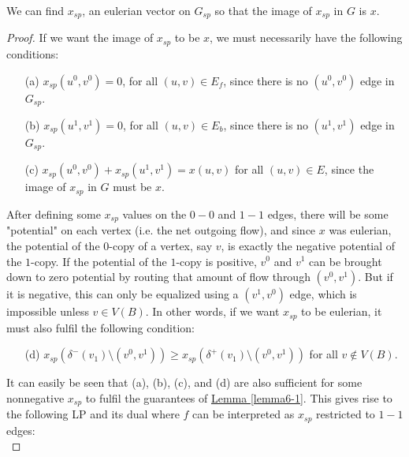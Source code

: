 \documentclass[./main.tex]{subfiles}
\begin{document}
			\begin{lemma}\label{lemma6-1}		
				We can find $x_{sp}$, an eulerian vector on $G_{sp}$ so that the image of $x_{sp}$ in $G$ is $x$.
			\end{lemma}
			\begin{proof}
			If we want the image of $x_{sp}$ to be $x$, we must necessarily have the following conditions:
				\begin{itemize}
					\item[(a)] $x_{sp}(u^0,v^0) = 0$, for all $(u,v)\in E_f$, since there is no $(u^0,v^0)$ edge in $G_{sp}$.
					\item[(b)] $x_{sp}(u^1,v^1) = 0$, for all $(u,v)\in E_b$, since there is no $(u^1,v^1)$ edge in $G_{sp}$.
					\item[(c)] $x_{sp}(u^0,v^0)+x_{sp}(u^1,v^1) = x(u,v)$ for all $(u,v)\in E$, since the image of $x_{sp}$ in $G$ must be $x$.\\
				\end{itemize}
	After defining some $x_{sp}$ values on the $0-0$ and $1-1$ edges, there will be some "potential" on each vertex (i.e. the net outgoing flow), and since $x$ was eulerian, the potential of the $0$-copy of a vertex, say $v$, is exactly the negative potential of the $1$-copy.
			If the potential of the $1$-copy is positive, $v^0$ and $v^1$ can be brought down to zero potential by routing that amount of flow through $(v^0,v^1)$. 
			But if it is negative, this can only be equalized using a $(v^1,v^0)$ edge, which is impossible unless $v\in V(B)$. In other words, if we want $x_{sp}$ to be eulerian, it must also fulfil the following condition:
			\begin{itemize}
				\item[(d)] $x_{sp}(\delta^-(v_1)\setminus (v^0,v^1) )\geqslant x_{sp}(\delta^+(v_1)\setminus (v^0,v^1))$ for all $v\notin V(B)$.
			\end{itemize}

			It can easily be seen that (a), (b), (c), and (d) are also sufficient for some nonnegative $x_{sp}$ to fulfil the guarantees of \hyperref[lemma6-1]{Lemma \ref{lemma6-1}}.
			 This gives rise to the following LP and its dual where $f$ can be interpreted as $x_{sp}$ restricted to $1-1$ edges:\\
			 \vspace{2mm}
			

\end{proof}
\end{document}
